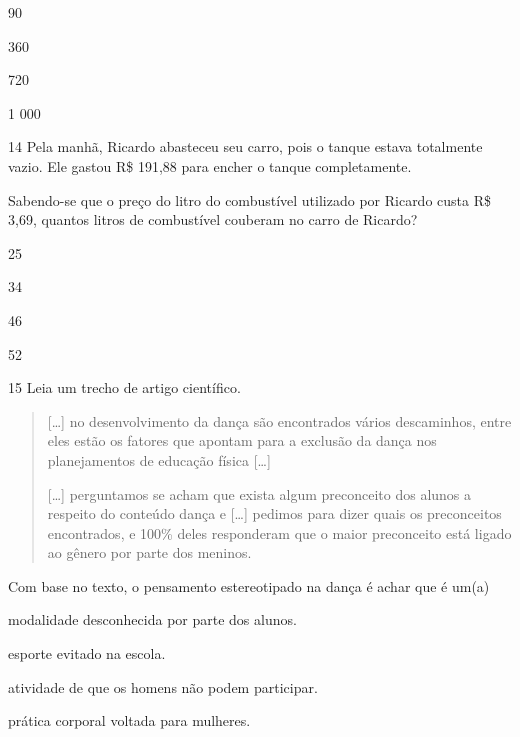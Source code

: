 \begin{minipage}{.5\textwidth}
\begin{escolha}
\item
  90
\item
  360
\item
  720
\item
  1 000
\end{escolha}
\end{minipage}


\num{14} Pela manhã, Ricardo abasteceu seu carro, pois o tanque estava
totalmente vazio. Ele gastou R\$ 191,88 para encher o tanque
completamente.

Sabendo-se que o preço do litro do combustível utilizado por Ricardo
custa R\$ 3,69, quantos litros de combustível couberam no carro de
Ricardo?

\begin{minipage}{.5\textwidth}
\begin{escolha}
\item
  25
\item
  34
\item
  46
\item
  52
\end{escolha}
\end{minipage}



\pagebreak
\num{15} Leia um trecho de artigo científico.
\begin{quote}
  {[}\ldots{}{]} no desenvolvimento da dança são encontrados vários
  descaminhos, entre eles estão os fatores que apontam para a exclusão
  da dança nos planejamentos de educação física {[}\ldots{}{]}

{[}\ldots{}{]} perguntamos se acham que exista algum preconceito dos alunos a
respeito do conteúdo dança e {[}\ldots{}{]} pedimos para dizer quais os
preconceitos encontrados, e 100\% deles responderam que o maior
preconceito está ligado ao gênero por parte dos meninos.

\end{quote}

\noindent{}Com base no texto, o pensamento estereotipado na dança é achar que é um(a)

\begin{escolha}
\item modalidade desconhecida por parte dos alunos.

\item esporte evitado na escola.

\item atividade de que os homens não podem participar.

\item prática corporal voltada para mulheres.
\end{escolha}



